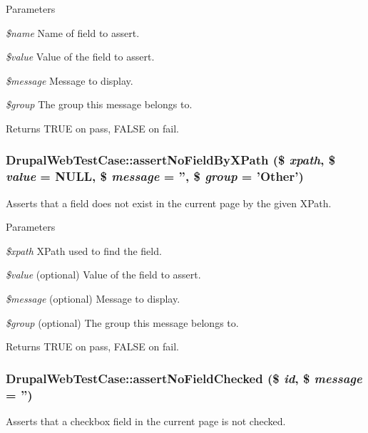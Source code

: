 \begin{DoxyParams}{Parameters}
\item[{\em \$name}]Name of field to assert. \item[{\em \$value}]Value of the field to assert. \item[{\em \$message}]Message to display. \item[{\em \$group}]The group this message belongs to. \end{DoxyParams}
\begin{DoxyReturn}{Returns}
TRUE on pass, FALSE on fail. 
\end{DoxyReturn}
\hypertarget{classDrupalWebTestCase_a6e63d3934a6804ea09b0148acd849be0}{
\subsubsection[{assertNoFieldByXPath}]{\setlength{\rightskip}{0pt plus 5cm}DrupalWebTestCase::assertNoFieldByXPath (\$ {\em xpath}, \/  \$ {\em value} = {\ttfamily NULL}, \/  \$ {\em message} = {\ttfamily ''}, \/  \$ {\em group} = {\ttfamily 'Other'})}}
\label{classDrupalWebTestCase_a6e63d3934a6804ea09b0148acd849be0}
Asserts that a field does not exist in the current page by the given XPath.


\begin{DoxyParams}{Parameters}
\item[{\em \$xpath}]XPath used to find the field. \item[{\em \$value}](optional) Value of the field to assert. \item[{\em \$message}](optional) Message to display. \item[{\em \$group}](optional) The group this message belongs to.\end{DoxyParams}
\begin{DoxyReturn}{Returns}
TRUE on pass, FALSE on fail. 
\end{DoxyReturn}
\hypertarget{classDrupalWebTestCase_a23fbbe9b681b00419a0023ef07b48067}{
\subsubsection[{assertNoFieldChecked}]{\setlength{\rightskip}{0pt plus 5cm}DrupalWebTestCase::assertNoFieldChecked (\$ {\em id}, \/  \$ {\em message} = {\ttfamily ''})}}
\label{classDrupalWebTestCase_a23fbbe9b681b00419a0023ef07b48067}
Asserts that a checkbox field in the current page is not checked.


